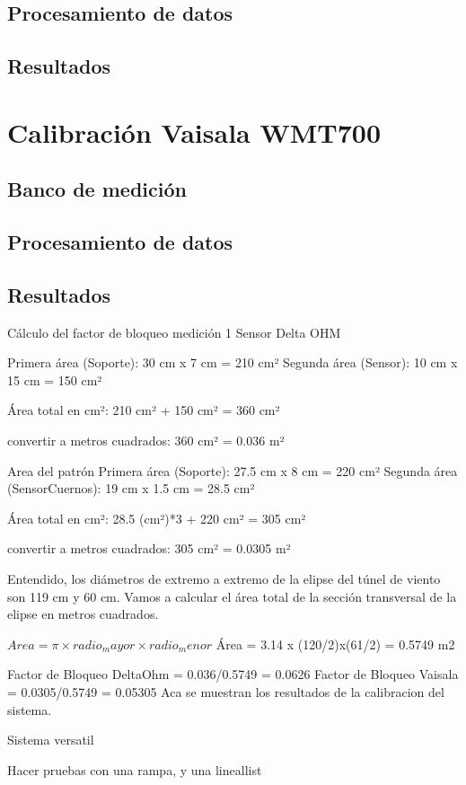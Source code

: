 \subsection{Procesamiento de datos}
\subsection{Resultados}


\section{Calibración Vaisala WMT700}
\subsection{Banco de medición}
\subsection{Procesamiento de datos}
\subsection{Resultados}


Cálculo del factor de bloqueo medición 1
Sensor Delta OHM

Primera área (Soporte): 30 cm x 7 cm = 210 cm²
Segunda área (Sensor): 10 cm x 15 cm = 150 cm²

Área total en cm²: 210 cm² + 150 cm² = 360 cm²

convertir a metros cuadrados:
360 cm² = 0.036 m²


Area del patrón
Primera área (Soporte): 27.5 cm x 8 cm = 220 cm²
Segunda área (SensorCuernos): 19 cm x 1.5 cm = 28.5 cm²

Área total en cm²: 28.5 (cm²)*3 + 220 cm² =  305 cm²

convertir a metros cuadrados:
305 cm² = 0.0305 m²


Entendido, los diámetros de extremo a extremo de la elipse del túnel de viento son 119 cm y 60 cm. Vamos a calcular el área total de la sección transversal de la elipse en metros cuadrados.

$Area=\pi × radio_mayor × radio_ menor$
Área = 3.14 x (120/2)x(61/2) = 0.5749 m2

Factor de Bloqueo DeltaOhm = 0.036/0.5749 = 0.0626
Factor de Bloqueo Vaisala = 0.0305/0.5749 = 0.05305
Aca se muestran los resultados de la calibracion del sistema.

Sistema versatil

Hacer pruebas con una rampa, y una lineallist